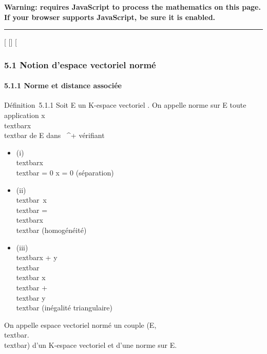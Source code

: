 \textbf{Warning: 
requires JavaScript to process the mathematics on this page.\\ If your
browser supports JavaScript, be sure it is enabled.}

\begin{center}\rule{3in}{0.4pt}\end{center}

{[}
{[}{]}
{[}

\subsubsection{5.1 Notion d'espace vectoriel normé}

\paragraph{5.1.1 Norme et distance associée}

Définition~5.1.1 Soit E un K-espace vectoriel . On appelle norme sur E
toute application
x\mapsto~\\textbar{}x\\textbar{}
de E dans ~^+ vérifiant

\begin{itemize}
\itemsep1pt\parskip0pt
\item
  (i) \\textbar{}x\\textbar{} = 0
  \Leftrightarrow x = 0 (séparation)
\item
  (ii) \\textbar{}\lambda~x\\textbar{} =
  \textbar{}\lambda~\textbar{}\\textbar{}x\\textbar{}
  (homogénéité)
\item
  (iii) \\textbar{}x + y\\textbar{}
  \leq\\textbar{} x\\textbar{}
  +\\textbar{} y\\textbar{} (inégalité
  triangulaire)
\end{itemize}

On appelle espace vectoriel normé un couple
(E,\\textbar{}.\\textbar{}) d'un K-espace
vectoriel et d'une norme sur E.

